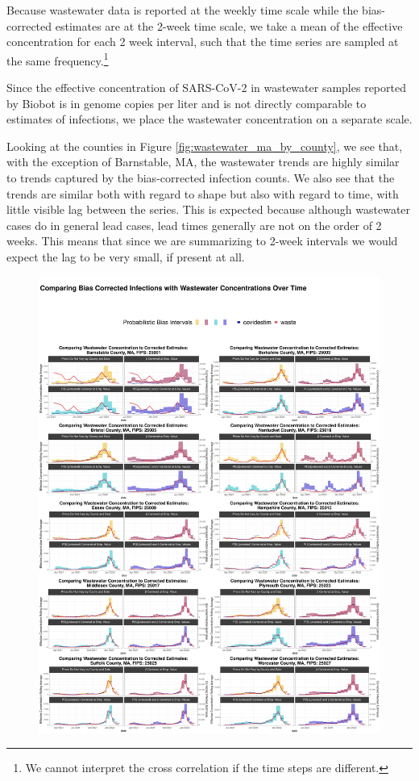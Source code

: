 \documentclass[12pt,twoside]{smiththesis}
\begin{document}
Because wastewater data is reported at the weekly time scale while the bias-corrected estimates are at the 2-week time scale, we take a mean of the effective concentration for each 2 week interval, such that the time series are sampled at the same frequency.\footnote{We cannot interpret the cross correlation if the time steps are different.}

Since the effective concentration of SARS-CoV-2 in wastewater samples reported by Biobot is in genome copies per liter and is not directly comparable to estimates of infections, we place the wastewater concentration on a separate scale.

Looking at the counties in Figure \ref{fig:wastewater_ma_by_county}, we see that, with the exception of Barnstable, MA, the wastewater trends are highly similar to trends captured by the bias-corrected infection counts. We also see that the trends are similar both with regard to shape but also with regard to time, with little visible lag between the series. This is expected because although wastewater cases do in general lead cases, lead times generally are not on the order of 2 weeks. This means that since we are summarizing to 2-week intervals we would expect the lag to be very small, if present at all.
\begin{figure}
\includegraphics[width=1\linewidth]{figure/wastewater_ma_by_county} \caption{\label{fig:wastewater_ma_by_county}}\label{fig:unnamed-chunk-29}
\end{figure}
\end{document}
